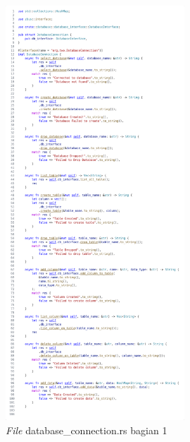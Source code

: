 \begin{figure}[H]
  \centering{}
	\includegraphics[width=0.6\textwidth]{gambar/lampiran/file-database-connection-1.png}
  \caption{\emph{File} database\_connection.rs bagian 1}
\end{figure}

